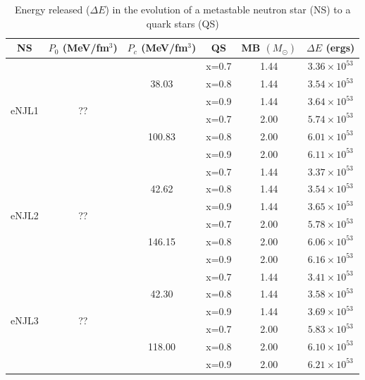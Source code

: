 \documentclass[prc, reprint, amsmath, floatfix,10pt]{revtex4-1}
\begin{document}
\begin{table}[!htpb]

\centering
\caption{Energy released ($\Delta E$) in the evolution of a metastable
  neutron star (NS)  to a quark stars (QS)}\label{table:ns-qs}
\begin{ruledtabular}
\begin{tabular}{cccccc}
NS                    & $P_0$ (MeV/fm$^3$) & $P_c$ (MeV/fm$^3$) & QS                                 &  MB $(M_\odot)$ & $\Delta E$ (ergs)      \\ \hline
\multirow{6}{*}{eNJL1}&\multirow{6}{*}{??}& \multirow{3}{*}{38.03}  & x=0.7 & 1.44   & $3.36\times 10^{53}$ \\ \cline{4-6} 
                      & 				   &   						 & x=0.8 & 1.44   & $3.54\times 10^{53}$ \\ \cline{4-6} 
                      & 				   &  						 & x=0.9 & 1.44   & $3.64\times 10^{53}$ \\ \cline{3-6} 
                      & 				   & \multirow{3}{*}{100.83} & x=0.7 & 2.00   & $5.74\times 10^{53}$ \\ \cline{4-6} 
                      & 				   & 						 & x=0.8 & 2.00   & $6.01\times 10^{53}$ \\ \cline{4-6} 
                      &					   &  						 & x=0.9 & 2.00   & $6.11\times 10^{53}$ \\ \hline
\multirow{6}{*}{eNJL2}&\multirow{6}{*}{??}& \multirow{3}{*}{42.62}	 & x=0.7 & 1.44   & $3.37\times 10^{53}$ \\ \cline{4-6} 
                      & 				   & 						 & x=0.8 & 1.44   & $3.54\times 10^{53}$ \\ \cline{4-6} 
                      & 				   & 						 & x=0.9 & 1.44   & $3.65\times 10^{53}$ \\ \cline{3-6} 
                      & 				   & \multirow{3}{*}{146.15} & x=0.7 & 2.00   & $5.78\times 10^{53}$ \\ \cline{4-6} 
                      & 				   & 						 & x=0.8 & 2.00   & $6.06\times 10^{53}$ \\ \cline{4-6} 
                      & 				   & 				  	     & x=0.9 & 2.00   & $6.16\times 10^{53}$ \\ \hline
\multirow{6}{*}{eNJL3}&\multirow{6}{*}{??}& \multirow{3}{*}{42.30}	 & x=0.7 & 1.44   & $3.41\times 10^{53}$ \\ \cline{4-6} 
                      & 				   & 		   				 & x=0.8 & 1.44   & $3.58\times 10^{53}$ \\ \cline{4-6} 
                      & 				   & 						 & x=0.9 & 1.44   & $3.69\times 10^{53}$ \\ \cline{3-6} 
                      & 				   & \multirow{3}{*}{118.00} & x=0.7 & 2.00   & $5.83\times 10^{53}$ \\ \cline{4-6} 
                      & 				   & 			 			 & x=0.8 & 2.00   & $6.10\times 10^{53}$ \\ \cline{4-6} 
                      &					   &  						 & x=0.9 & 2.00   & $6.21\times 10^{53}$ \\ 
\end{tabular}
\end{ruledtabular}
\end{table}
\end{document}
